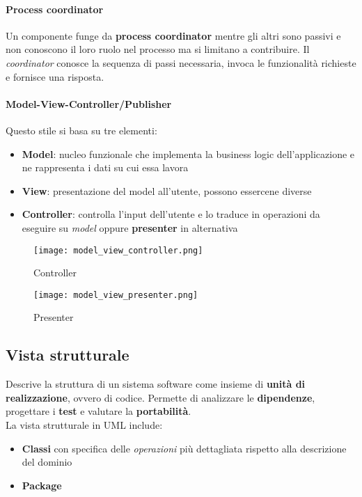 \paragraph{Process coordinator}
Un componente funge da \textbf{process coordinator} mentre gli altri sono passivi e non conoscono il loro ruolo nel processo ma si limitano a contribuire. Il \textit{coordinator} conosce la sequenza di passi necessaria, invoca le funzionalità richieste e fornisce una risposta.

\paragraph{Model-View-Controller/Publisher}
Questo stile si basa su tre elementi:
\begin{itemize}
	\item \textbf{Model}: nucleo funzionale che implementa la business logic dell'applicazione e ne rappresenta i dati su cui essa lavora
	\item \textbf{View}: presentazione del model all'utente, possono essercene diverse
	\item \textbf{Controller}: controlla l'input dell'utente e lo traduce in operazioni da eseguire su \textit{model} oppure \textbf{presenter} in alternativa
\end{itemize}
\begin{figure}[!h]
	\centering
	\begin{minipage}[b]{0.4\textwidth}
		\texttt{[image: model\_view\_controller.png]}
		\caption*{Controller}
	\end{minipage}
	\hspace{10pt}
	\begin{minipage}[b]{0.4\textwidth}
		\texttt{[image: model\_view\_presenter.png]}
		\caption*{Presenter}
	\end{minipage}
\end{figure}

\subsection{Vista strutturale}
Descrive la struttura di un sistema software come insieme di \textbf{unità di realizzazione}, ovvero di codice. Permette di analizzare le \textbf{dipendenze}, progettare i \textbf{test} e valutare la \textbf{portabilità}.\\
La vista strutturale in UML include:
\begin{itemize}
	\item \textbf{Classi} con specifica delle \textit{operazioni} più dettagliata rispetto alla descrizione del dominio
	\item \textbf{Package}
\end{itemize}

